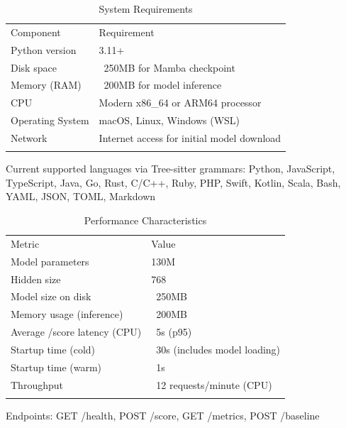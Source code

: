 

\begin{table}[t]
    \centering
    \caption{System Requirements}
    \label{tab:sys_reqs}
    \begin{tabular}{ll}
        \toprule
        Component & Requirement \\\n        \midrule
        Python version & 3.11+ \\\n        Disk space & ~250MB for Mamba checkpoint \\\n        Memory (RAM) & ~200MB for model inference \\\n        CPU & Modern x86_64 or ARM64 processor \\\n        Operating System & macOS, Linux, Windows (WSL) \\\n        Network & Internet access for initial model download \\\n        \bottomrule
    \end{tabular}
\end{table}


Current supported languages via Tree-sitter grammars:
Python, JavaScript, TypeScript, Java, Go, Rust, C/C++, Ruby, PHP, Swift, Kotlin, Scala, Bash, YAML, JSON, TOML, Markdown


\begin{table}[t]
    \centering
    \caption{Performance Characteristics}
    \label{tab:performance}
    \begin{tabular}{ll}
        \toprule
        Metric & Value \\\n        \midrule
        Model parameters & 130M \\\n        Hidden size & 768 \\\n        Model size on disk & ~250MB \\\n        Memory usage (inference) & ~200MB \\\n        Average /score latency (CPU) & ~5s (p95) \\\n        Startup time (cold) & ~30s (includes model loading) \\\n        Startup time (warm) & ~1s \\\n        Throughput & ~12 requests/minute (CPU) \\\n        \bottomrule
    \end{tabular}
\end{table}


Endpoints: GET /health, POST /score, GET /metrics, POST /baseline

